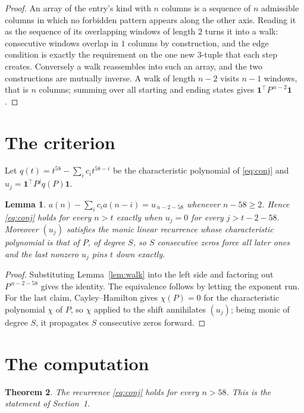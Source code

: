 \documentclass[11pt,a4paper]{article}
\theoremstyle{plain}
\newtheorem{theorem}{Theorem}
\newtheorem{lemma}[theorem]{Lemma}
\theoremstyle{definition}
\begin{document}
\begin{proof}
An array of the entry's kind with $n$ columns is a sequence of $n$ admissible columns in
which no forbidden pattern appears along the other axis. Reading it as the sequence of its
overlapping windows of length $2$ turns it into a walk: consecutive windows overlap in
$1$ columns by construction, and the edge condition is exactly the requirement on the one
new $3$-tuple that each step creates. Conversely a walk reassembles into such an array,
and the two constructions are mutually inverse. A walk of length $n-2$ visits $n-1$
windows, that is $n$ columns; summing over all starting and ending states gives
$\mathbf{1}^{\!\top}P^{\,n-2}\mathbf{1}$.
\end{proof}

\section{The criterion}

Let $q(t)=t^{58}-\sum_i c_i t^{58-i}$ be the characteristic polynomial of
\eqref{eq:conj} and $u_j=\mathbf{1}^{\!\top}P^{j}q(P)\mathbf{1}$.

\begin{lemma}\label{lem:crit}
$a(n)-\sum_i c_i a(n-i)=u_{\,n-2-58}$ whenever $n-58\ge2$. Hence
\eqref{eq:conj} holds for every $n>t$ exactly when $u_j=0$ for every
$j>t-2-58$. Moreover $(u_j)$ satisfies the monic linear recurrence whose
characteristic polynomial is that of $P$, of degree $S$, so $S$ consecutive zeros force all
later ones and the last nonzero $u_j$ pins $t$ down exactly.
\end{lemma}

\begin{proof}
Substituting Lemma~\ref{lem:walk} into the left side and factoring out
$P^{\,n-2-58}$ gives the identity. The equivalence follows by letting the exponent
run. For the last claim, Cayley--Hamilton gives $\chi(P)=0$ for the characteristic
polynomial $\chi$ of $P$, so $\chi$ applied to the shift annihilates $(u_j)$; being monic of
degree $S$, it propagates $S$ consecutive zeros forward.
\end{proof}

\section{The computation}

\begin{theorem}
The recurrence \eqref{eq:conj} holds for every $n>58$. This is the statement of
Section~1.
\end{theorem}
\end{document}
